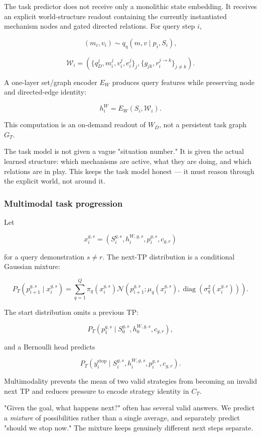 \documentclass[11pt]{article}
\newenvironment{plainword}{%
  \par\medskip\noindent\begin{minipage}{\textwidth}%
  \color{gray!75!black}\small\itshape
}{%
  \end{minipage}\par\medskip}
\begin{document}
The task predictor does not receive only a monolithic state embedding. It receives an explicit world-structure readout containing
the currently instantiated mechanism nodes and gated directed relations. For query step $i$,

\[
(m_i,v_i)\sim q_\eta(m,v\mid p_i,S_i),
\]

\[
\mathcal W_i=
\left(
\{q_D^j,m_i^j,v_i^j,e_i^j\}_j,
\{g_{jk},r_i^{j\rightarrow k}\}_{j\neq k}
\right).
\]

A one-layer set/graph encoder $E_W$ produces query features while preserving node and directed-edge identity:

\[
h_i^W=E_W(S_i,\mathcal W_i).
\]

This computation is an on-demand readout of $W_D$, not a persistent task graph $G_T$.

\begin{plainword}
The task model is not given a vague "situation number." It is given the actual learned structure: which mechanisms are active, what
they are doing, and which relations are in play. This keeps the task model honest --- it must reason through the explicit world, not
around it.
\end{plainword}

\subsubsection*{Multimodal task progression}

Let

\[
x_i^{g,s}=(S_i^{g,s},h_i^{W,g,s},p_i^{g,s},c_{g,r})
\]

for a query demonstration $s\neq r$. The next-TP distribution is a conditional Gaussian mixture:

\[
\boxed{
P_T(p_{i+1}^{g,s}\mid x_i^{g,s})=
\sum_{q=1}^{Q}\pi_q(x_i^{g,s})
\mathcal N\!\left(
p_{i+1}^{g,s};\mu_q(x_i^{g,s}),
\operatorname{diag}(\sigma_q^2(x_i^{g,s}))
\right).}
\]

The start distribution omits a previous TP:

\[
P_T(p_1^{g,s}\mid S_0^{g,s},h_0^{W,g,s},c_{g,r}),
\]

and a Bernoulli head predicts

\[
P_T(y_i^{\mathrm{stop}}\mid S_i^{g,s},h_i^{W,g,s},p_i^{g,s},c_{g,r}).
\]

Multimodality prevents the mean of two valid strategies from becoming an invalid next TP and reduces pressure to encode strategy
identity in $C_T$.

\begin{plainword}
"Given the goal, what happens next?" often has several valid answers. We predict a \emph{mixture} of possibilities rather than a
single average, and separately predict "should we stop now." The mixture keeps genuinely different next steps separate.
\end{plainword}
\end{document}
